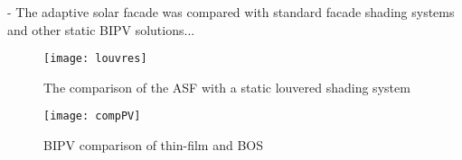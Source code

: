
- The adaptive solar facade was compared with standard facade shading systems and other static BIPV solutions...

\begin{figure}[H]
\begin{center}
\texttt{[image: louvres]}
\caption{The comparison of the ASF with a static louvered shading system}
\label{fig:louvres}
\end{center}
\end{figure}

\begin{figure}[H]
\begin{center}
\texttt{[image: compPV]}
\caption{BIPV comparison of thin-film and BOS}
\label{fig:compPV}
\end{center}
\end{figure}
